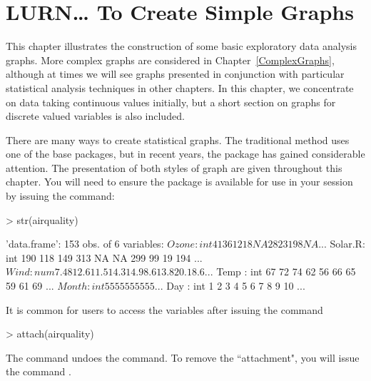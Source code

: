 

\chapter{LURN\ldots{} To Create Simple Graphs} 
\label{SimpleGraphs} 
 
 
 


This chapter illustrates the construction of some basic exploratory data analysis graphs. More complex graphs are considered in Chapter~\ref{ComplexGraphs}, although at times we will see graphs presented in conjunction with particular statistical analysis techniques in other chapters. In this chapter, we concentrate on data taking continuous values initially, but a short section on graphs for discrete valued variables is also included. 

There are many ways to create statistical graphs. The traditional method uses one of the base \R{} packages, but in recent years, the  package has gained considerable attention. The presentation of both styles of graph are given throughout this chapter. You will need to ensure the  package is available for use in your \R{} session by issuing the command:
\begin{Schunk}
\begin{Sinput}
> str(airquality) 
\end{Sinput}
\begin{Soutput}
'data.frame':	153 obs. of  6 variables:
 $ Ozone  : int  41 36 12 18 NA 28 23 19 8 NA ...
 $ Solar.R: int  190 118 149 313 NA NA 299 99 19 194 ...
 $ Wind   : num  7.4 8 12.6 11.5 14.3 14.9 8.6 13.8 20.1 8.6 ...
 $ Temp   : int  67 72 74 62 56 66 65 59 61 69 ...
 $ Month  : int  5 5 5 5 5 5 5 5 5 5 ...
 $ Day    : int  1 2 3 4 5 6 7 8 9 10 ...
\end{Soutput}
\end{Schunk}
It is common for \R{} users to access the variables after issuing the command 
\begin{Schunk}
\begin{Sinput}
> attach(airquality) 
\end{Sinput}
\end{Schunk}
The  command undoes the  command. To remove the ``attachment", you will issue the command . 
 
